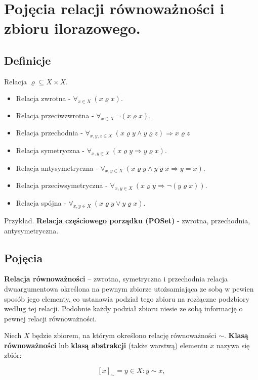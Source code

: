 \section{Pojęcia relacji równoważności i zbioru ilorazowego.}

\subsection{Definicje}

Relacja $\varrho \subseteq X \times X$.
\begin{itemize}[itemsep=0pt,partopsep=0pt, parsep=0pt]
    \item Relacja zwrotna - $\forall_{x\in X}\ (x\varrho x)$.
    \item Relacja przeciwzwrotna - $\forall_{x\in X}\ \neg(x\varrho x)$.
    \item Relacja przechodnia - $\forall_{x, y, z\in X}\ (x\varrho y \land y\varrho z) \Rightarrow x \varrho z$
    \item Relacja symetryczna - $\forall_{x, y\in X}\ (x\varrho y \Rightarrow y \varrho x)$.
    \item Relacja antysymetryczna - $\forall_{x, y\in X}\ (x\varrho y \land y\varrho x \Rightarrow y = x)$.
    \item Relacja przeciwsymetryczna - $\forall_{x, y\in X}\ (x\varrho y \Rightarrow \neg(y \varrho x))$.
    \item Relacja spójna - $\forall_{x, y\in X}\ (x\varrho y \lor y \varrho x)$.
\end{itemize}

Przykład. \textbf{Relacja częściowego porządku (POSet)} - zwrotna, przechodnia, antysymetryczna.

\subsection{Pojęcia}

\textbf{Relacja równoważności} – zwrotna, symetryczna i przechodnia relacja dwuargumentowa określona
na pewnym zbiorze utożsamiająca ze sobą w pewien sposób jego elementy,
co ustanawia podział tego zbioru na rozłączne podzbiory według tej relacji.
Podobnie każdy podział zbioru niesie ze sobą informację o pewnej relacji równoważności.

Niech $X$ będzie zbiorem, na którym określono relację równoważności $\sim$.
\textbf{Klasą równoważności} lub \textbf{klasą abstrakcji} (także warstwą) elementu $x$ nazywa się zbiór:

\[
    [x]_\sim ={y\in X:y\sim x},
\]

